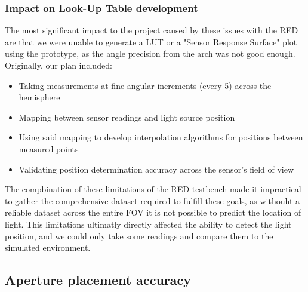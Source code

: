 \subsubsection{Impact on Look-Up Table development}

The most significant impact to the project caused by these issues with the \ac{RED} are that we were unable to generate a \ac{LUT} or a "Sensor Response Surface" plot using the prototype, as the angle precision from the arch was not good enough. Originally, our plan included:

\begin{itemize}
    \item Taking measurements at fine angular increments (every 5\textdegree{}) across the hemisphere
    \item Mapping between sensor readings and light source position
    \item Using said mapping to develop interpolation algorithms for positions between measured points
    \item Validating position determination accuracy across the sensor's field of view
\end{itemize}

The compbination of these limitations of the \ac{RED} testbench made it impractical to gather the comprehensive dataset required to fulfill these goals, as withouht a reliable dataset across the entire \ac{FOV} it is not possible to predict the location of light.
This limitations ultimatly directly affected the ability to detect the light position, and we could only take some readings and compare them to the simulated environment.

\subsection{Aperture placement accuracy}




%

